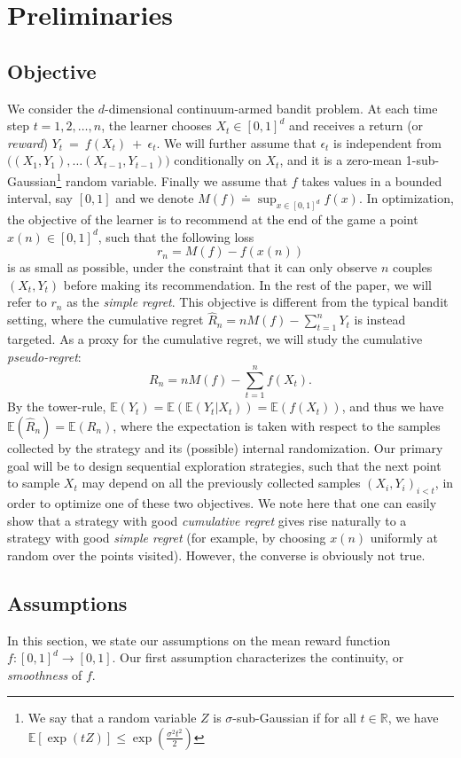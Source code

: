 \documentclass[final,12pt]{colt2018}
\begin{document}
\section{Preliminaries}\label{sec:prelim}
\subsection{Objective}
We consider the $d$-dimensional continuum-armed bandit problem. At each time step $t = 1, 2, \ldots, n$, the learner  chooses $X_t \in [0,1]^d$ and receives a return (or \textit{reward}) $Y_t~=~f(X_t)~+~\epsilon_t$. We will further assume that $\epsilon_t$ is independent from $\big((X_1,Y_1), \ldots (X_{t-1},Y_{t-1})\big)$ conditionally on $X_t$, and it is a zero-mean 1-sub-Gaussian\footnote{We say that a random variable $Z$ is $\sigma$-sub-Gaussian if for all $t \in \mathbb R$, we have $\mathbb E[\exp(tZ)] \leq \exp(\frac{\sigma^2 t^2}{2})$} random variable. Finally we assume that $f$ takes values in a bounded interval, say $[0,1]$ and we denote ${M(f)\doteq \sup_{x\in [0,1]^d} f(x)}$. In optimization, the objective of the learner is to recommend at the end of the game a point ${x(n) \in [0,1]^d}$, such that the following loss
$$
r_n = M(f) - f(x(n))
$$
is as small as possible, under the constraint that it can only observe $n$ couples $(X_t, Y_t)$ before making its recommendation. In the rest of the paper, we will refer to $r_n$ as the \textit{simple regret}. This objective is different from the typical bandit setting, where the cumulative regret $\widehat{R}_n = n M(f) - \sum_{t=1}^n Y_t$ is instead targeted. As a proxy for the cumulative regret, we will study the cumulative \textit{pseudo-regret}:
$$
R_n = n M(f) - \sum_{t=1}^n f(X_t).
$$
By the tower-rule, $\mathbb{E}(Y_t) = \mathbb{E}(\mathbb{E}(Y_t | X_t)) = \mathbb{E}(f(X_t))$, and thus we have $\mathbb{E}(\widehat{R}_n) = \mathbb{E}(R_n)$, where the expectation is taken with respect to the samples collected by the strategy and its (possible) internal randomization. Our primary goal will be to design sequential exploration strategies, such that the next point to sample $X_t$ may depend on all the previously collected samples $(X_i,Y_i)_{i < t}$, in order to optimize one of these two objectives. We note here that one can easily show that a strategy with good \emph{cumulative regret} gives rise naturally to a strategy with good \emph{simple regret} (for example, by choosing $x(n)$ uniformly at random over the points visited). However, the converse is obviously not true.
\subsection{Assumptions}
In this section, we state our assumptions on the mean reward function $f: [0,1]^d \rightarrow [0,1]$. Our first assumption characterizes the continuity, or \textit{smoothness} of $f$.
\end{document}
